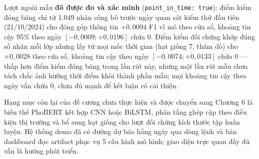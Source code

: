 \noindent Lượt ngoài mẫu \textbf{đã được đo và xác minh} (\texttt{point\_in\_time: true}):
điểm kiểm đóng băng chỉ từ 1.049 nhãn công bố trước ngày quan sát kiểm thử đầu tiên
(21/10/2024) cho đóng góp thông tin $+0{,}0094$ F1 vĩ mô theo cửa sổ, khoảng tin cậy
95\% theo ngày $[-0{,}0009; +0{,}0196]$ chứa 0. Điểm kiểm đối
chứng khớp đúng số nhãn mỗi lớp nhưng lấy từ mọi mốc thời gian (hạt giống 7, thăm
dò) cho $+0{,}0028$ theo cửa sổ, khoảng tin cậy theo ngày $[-0{,}0074; +0{,}0133]$
chứa 0 --- thấp hơn điểm kiểm đóng băng trong lần rút này,
nhưng một lần rút mẫu chưa tách chắc ảnh hưởng thời điểm khỏi thành phần mẫu; mọi
khoảng tin cậy theo ngày vẫn chứa 0, chưa đủ mạnh để kết luận có cải thiện.

\noindent Hạng mục còn lại của đề cương chưa thực hiện và được chuyển sang Chương 6 là
biến thể PhoBERT kết hợp CNN hoặc BiLSTM, phân tầng ghép cặp theo điều kiện thị
trường và bổ sung hạt giống cho lượt đối chứng kích thước tập huấn luyện.
Hệ thống demo đã có đường dự báo hằng ngày qua dòng lệnh và bản dashboard đọc
artifact phục vụ 5 cấu hình mô hình; giao diện trực quan đầy đủ vẫn là hướng phát triển.
